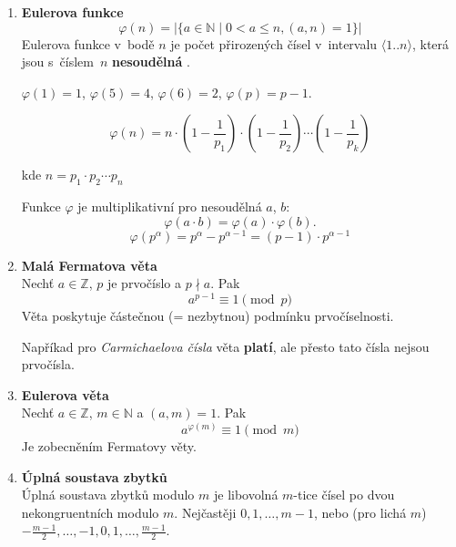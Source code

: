 \documentclass[12pt,a4paper]{article}
\begin{document}
\begin{enumerate}[leftmargin=*]
		
		\item \textbf{Eulerova funkce}
		\[ \varphi(n) = |\{ a \in \mathbb{N} \mid 0 < a \le n, (a,n) = 1\}| \]
		Eulerova funkce v~bodě $n$ je počet přirozených čísel v~intervalu
		$\langle 1..n \rangle$, která jsou s~číslem~$n$ \textbf{nesoudělná }.
		
		$\varphi(1) = 1$, $\varphi(5) = 4$, $\varphi(6) = 2$, $\varphi(p) = p-1$.
		
		\[ \varphi(n) = n \cdot \left( 1 - \frac{1}{p_1} \right) \cdot
		\left( 1 - \frac{1}{p_2} \right) \cdots \left( 1 - \frac{1}{p_k} \right) \]
		
		kde $n = p_1\cdot p_2  \cdots  p_n$
		
		Funkce $\varphi$ je multiplikativní pro nesoudělná $a$, $b$:
		\[ \varphi(a \cdot b) = \varphi(a) \cdot \varphi(b). \]
		\[ \varphi(p^\alpha) = p^\alpha - p^{\alpha-1} = (p - 1) \cdot p^{\alpha-1}\]
		
		\item \textbf{Malá Fermatova věta}\\
		Nechť $a \in \mathbb{Z}$, $p$ je prvočíslo a $p \nmid a$. Pak
		\[ a^{p-1} \equiv 1 \pmod{p} \]
		Věta poskytuje částečnou (= nezbytnou) podmínku prvočíselnosti.
		
		Napříkad pro \textit{Carmichaelova čísla} věta \textbf{platí}, ale přesto tato
		čísla nejsou prvočísla.
		
		\item \textbf{Eulerova věta}\\
		Nechť $a \in \mathbb{Z}$, $m \in \mathbb{N}$ a $(a,m) = 1$. Pak
		\[ a^{\varphi(m)} \equiv 1 \pmod{m} \]
		Je zobecněním Fermatovy věty.
		
		\item \textbf{Úplná soustava zbytků}\\
		Úplná soustava zbytků modulo $m$ je libovolná $m$-tice čísel po dvou
		nekongruentních modulo $m$. Nejčastěji $0, 1, \dots, m-1$, nebo
		(pro lichá $m$) $-\frac{m-1}{2}, \dots, -1, 0, 1, \dots, \frac{m-1}{2}$.
		

\end{enumerate}
\end{document}
